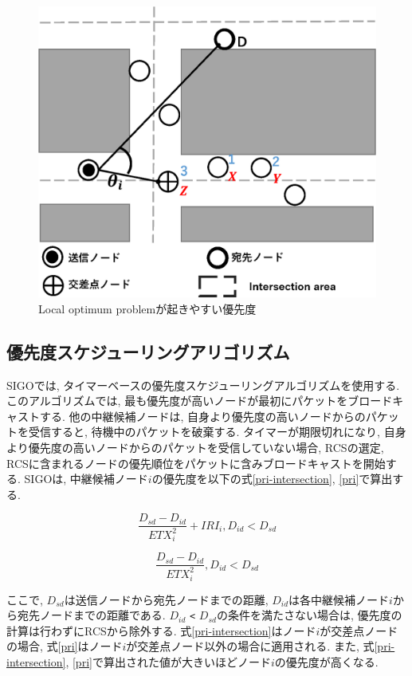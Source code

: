 \documentclass[10pt]{jreport}
\begin{document}
\begin{figure}[!ht]
	\centering
	\includegraphics[width=120mm]{figures/aim_SIGO.eps}
	\caption{Local optimum problemが起きやすい優先度}
	\label{fig:aim_SIGO}
\end{figure}




\subsection{優先度スケジューリングアリゴリズム}
\label{SIGO_priority}
SIGOでは, タイマーベースの優先度スケジューリングアルゴリズムを使用する. このアルゴリズムでは, 最も優先度が高いノードが最初にパケットをブロードキャストする. 他の中継候補ノードは, 自身より優先度の高いノードからのパケットを受信すると, 待機中のパケットを破棄する. タイマーが期限切れになり, 自身より優先度の高いノードからのパケットを受信していない場合, RCSの選定, RCSに含まれるノードの優先順位をパケットに含みブロードキャストを開始する. SIGOは, 中継候補ノード$i$の優先度を以下の式\ref{pri-intersection}, \ref{pri}で算出する.

\begin{equation}
	\label{pri-intersection}
	\frac{D_{sd} - D_{id}}{ETX_{i}^{2}} + IRI_i,  D_{id} < D_{sd}
\end{equation}

\begin{equation}
	\label{pri}
	\frac{D_{sd} - D_{id}}{ETX_{i}^{2}} ,   D_{id} < D_{sd}
\end{equation}

ここで, $D_{sd}$は送信ノードから宛先ノードまでの距離, $D_{id}$は各中継候補ノード$i$から宛先ノードまでの距離である. $D_{id}$ \verb|<| $D_{sd}$の条件を満たさない場合は, 優先度の計算は行わずにRCSから除外する. 式\ref{pri-intersection}はノード$i$が交差点ノードの場合, 式\ref{pri}はノード$i$が交差点ノード以外の場合に適用される. また, 式\ref{pri-intersection}, \ref{pri}で算出された値が大きいほどノード$i$の優先度が高くなる.
\end{document}
